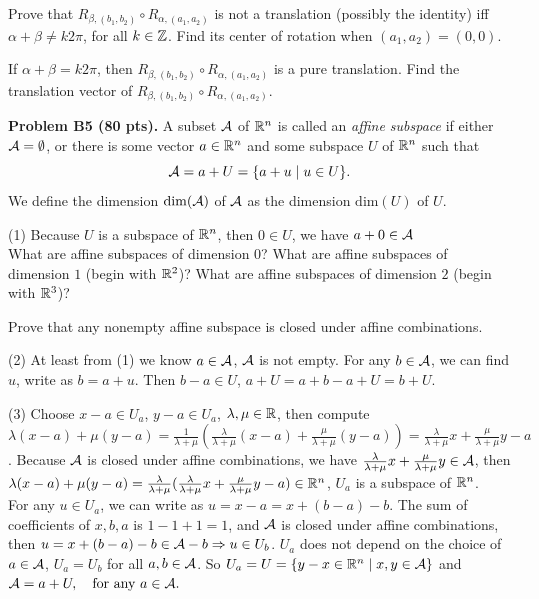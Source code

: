 \documentclass[12pt]{article}
\begin{document}
\medskip
Prove that  $R_{\beta, (b_1,b_2)} \circ R_{\alpha, (a_1,a_2)}$ is
not a translation (possibly the identity)  iff
$\alpha + \beta \not= k 2\pi$, for all  $k\in \mathbb{Z}$.
Find its center of rotation when $(a_1, a_2) = (0, 0)$.  

\medskip
If $\alpha + \beta = k 2\pi$, then  $R_{\beta, (b_1,b_2)} \circ
R_{\alpha, (a_1,a_2)}$
is a pure translation. 
Find the translation vector 
of $R_{\beta, (b_1,b_2)} \circ R_{\alpha, (a_1,a_2)}$.


\vspace {0.5cm}\noindent
{\bf Problem B5 (80 pts).}
A subset ${\cal A}$ of $\mathbb{R}^n$ is called an {\it affine subspace\/} if
either ${\cal A} = \emptyset$, or there is some vector $a\in \mathbb{R}^n$
and some subspace $U$ of $\mathbb{R}^n$ such that
\[
{\cal A} = a + U = \{a + u \mid u \in U\}.
\]
We define the dimension $\mathrm{dim}({\cal A})$ of ${\cal A}$ as the dimension
$\mathrm{dim}(U)$ of $U$.

\medskip
(1)
Because $U$ is a subspace of $\mathbb{R}^n$, then $0 \in U$, we have $
a + 0 \in {\cal A}$
\medskip \\
What are affine subspaces of dimension $0$?
What are affine subspaces of dimension $1$ (begin with $\mathbb{R}^2$)?
What are affine subspaces of dimension $2$ (begin with $\mathbb{R}^3$)?

\medskip
Prove that any nonempty affine subspace is closed under affine
combinations.

\medskip
(2) At least from (1) we know $a \in {\cal A}$, ${\cal A}$ is not empty.
For any $b \in {\cal A}$, we can find $u$, write as $b = a + u$. Then   $b - a \in U$, $a + U = a + b - a + U = b + U$.

\medskip
(3)
Choose $x - a \in U_a$, $y - a \in U_a$, $\lambda, \mu \in \mathbb{R}$, then compute $\lambda (x - a) + \mu (y - a) = \frac{1}{\lambda + \mu}(\frac{\lambda}{\lambda + \mu}(x - a) + \frac{\mu}{\lambda + \mu}(y - a)) = \frac{\lambda}{\lambda + \mu} x + \frac{\mu}{\lambda + \mu} y - a$. Because ${\cal A}$ is closed under affine combinations, we have $\frac{\lambda}{\lambda + \mu} x + \frac{\mu}{\lambda + \mu} y \in {\cal A}$, then $\lambda (x - a) + \mu (y - a) = \frac{\lambda}{\lambda + \mu} (\frac{\lambda}{\lambda + \mu} x + \frac{\mu}{\lambda + \mu} y - a) \in \mathbb{R}^n$, $U_a$ is a subspace of $\mathbb{R}^n$.\\
For any $u \in U_a$, we can write as $u = x - a = x + (b - a) - b$. The sum of coefficients of $x, b, a$ is $1 -1 + 1 = 1$, and ${\cal A}$ is closed under affine combinations, then $u = x + (b -a)-b \in {\cal A} - b \Rightarrow u \in U_b$. $U_a$ does not depend on the choice of $a \in {\cal A}$, $U_a = U_b$ for all $a, b\in {\cal A}$.
So $U_a = U = \{y - x \in \mathbb{R}^n \mid x, y \in {\cal A}\}$ and
$
{\cal A} = a + U, \quad\hbox{for any $a\in {\cal A}$}.
$
\end{document}
